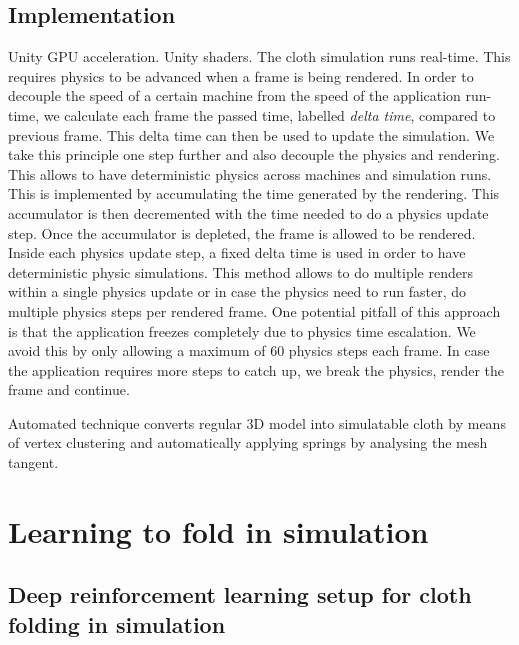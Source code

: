 \documentclass[\home/main.tex]{subfiles}
\begin{document}
\subsection{Implementation}
Unity
GPU acceleration. Unity shaders. 
The cloth simulation runs real-time. This requires physics to be advanced when a frame is being rendered. In order to decouple the speed of a certain machine from the speed of the application run-time, we calculate each frame the passed time, labelled \textit{delta time}, compared to previous frame. This delta time can then be used to update the simulation. We take this principle one step further and also decouple the physics and rendering. This allows to have deterministic physics across machines and simulation runs. This is implemented by accumulating the time generated by the rendering. This accumulator is then decremented with the time needed to do a physics update step. Once the accumulator is depleted, the frame is allowed to be rendered. Inside each physics update step, a fixed delta time is used in order to have deterministic physic simulations. This method allows to do multiple renders within a single physics update or in case the physics need to run faster, do multiple physics steps per rendered frame. One potential pitfall of this approach is that the application freezes completely due to physics time escalation. We avoid this by only allowing a maximum of $60$ physics steps each frame. In case the application requires more steps to catch up, we break the physics, render the frame and continue. 


Automated technique converts regular 3D model into simulatable cloth by means of vertex clustering and automatically applying springs by analysing the mesh tangent. 

\section{Learning to fold in simulation}
\subsection{Deep reinforcement learning setup for cloth folding in simulation}
\end{document}
